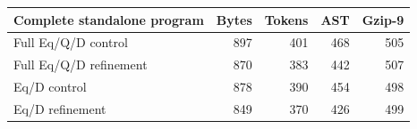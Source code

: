 \begin{center}
\begin{tabular}{lrrrr}
\toprule
Complete standalone program & Bytes & Tokens & AST & Gzip-9\\
\midrule
Full Eq/Q/D control & 897 & 401 & 468 & 505\\
Full Eq/Q/D refinement & 870 & 383 & 442 & 507\\
Eq/D control & 878 & 390 & 454 & 498\\
Eq/D refinement & 849 & 370 & 426 & 499\\
\bottomrule
\end{tabular}
\end{center}
